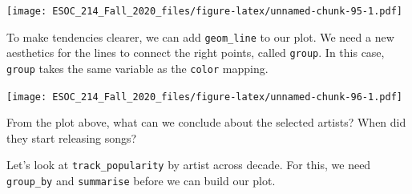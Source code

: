 \documentclass[
]{book}
\newenvironment{Shaded}{\begin{snugshade}}{\end{snugshade}}
\newcommand{\DataTypeTok}[1]{\textcolor[rgb]{0.13,0.29,0.53}{#1}}
\newcommand{\KeywordTok}[1]{\textcolor[rgb]{0.13,0.29,0.53}{\textbf{#1}}}
\newcommand{\NormalTok}[1]{#1}
\newcommand{\OperatorTok}[1]{\textcolor[rgb]{0.81,0.36,0.00}{\textbf{#1}}}
\newcommand{\StringTok}[1]{\textcolor[rgb]{0.31,0.60,0.02}{#1}}
\begin{document}
\begin{Shaded}
\end{Shaded}

\texttt{[image: ESOC\_214\_Fall\_2020\_files/figure-latex/unnamed-chunk-95-1.pdf]}

To make tendencies clearer, we can add \texttt{geom\_line} to our plot. We need a new aesthetics for the lines to connect the right points, called \texttt{group}. In this case, \texttt{group} takes the same variable as the \texttt{color} mapping.

\begin{Shaded}
\end{Shaded}

\texttt{[image: ESOC\_214\_Fall\_2020\_files/figure-latex/unnamed-chunk-96-1.pdf]}

From the plot above, what can we conclude about the selected artists? When did they start releasing songs?

Let's look at \texttt{track\_popularity} by artist across decade. For this, we need \texttt{group\_by} and \texttt{summarise} before we can build our plot.

\begin{Shaded}
\end{Shaded}
\end{document}
